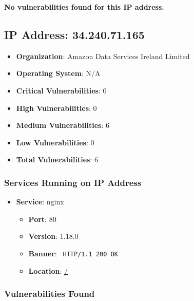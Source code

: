 \documentclass{article}
\begin{document}
\textbf{No vulnerabilities found for this IP address.}


\clearpage



\subsection*{IP Address: 34.240.71.165}

\begin{itemize}
    \item \textbf{Organization}: Amazon Data Services Ireland Limited
    \item \textbf{Operating System}:  N/A 
    \item \textbf{Critical Vulnerabilities}: 0
    \item \textbf{High Vulnerabilities}: 0
    \item \textbf{Medium Vulnerabilities}: 6
    \item \textbf{Low Vulnerabilities}: 0
    \item \textbf{Total Vulnerabilities}: 6
\end{itemize}

\subsubsection*{Services Running on IP Address}

\begin{itemize}
    
        \item \textbf{Service}: nginx
        \begin{itemize}
            \item \textbf{Port}: 80
            \item \textbf{Version}:  1.18.0 
            \item \textbf{Banner}: \texttt{ HTTP/1.1 200 OK
 }
            \item \textbf{Location}: \href{ / }{ / }
        \end{itemize}
    
\end{itemize}


\subsubsection*{Vulnerabilities Found}
\end{document}
